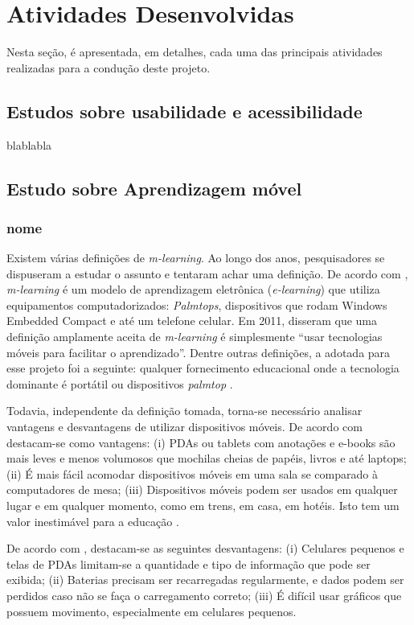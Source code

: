 \chapter{Atividades Desenvolvidas}\label{sec:ativ_desenvolvidas}
Nesta seção, é apresentada, em detalhes, cada uma das principais atividades realizadas para a condução deste projeto.

\section{Estudos sobre usabilidade e acessibilidade}\label{sec:estudos_usab_acess} 
blablabla

\section{Estudo sobre Aprendizagem móvel}\label{sec:estudos_ap_movel} 
\subsection{nome}
Existem várias definições de \textit{m-learning}. Ao longo dos anos, pesquisadores se dispuseram a estudar o assunto e tentaram achar uma definição. De acordo com \cite{Quinn2000}, \textit{m-learning} é um modelo de aprendizagem eletrônica (\textit{e-learning}) que utiliza equipamentos computadorizados: \textit{Palmtops}, dispositivos que rodam Windows Embedded Compact e até um telefone celular.
Em 2011, \cite{hwang2011research} disseram que uma definição amplamente aceita de \textit{m-learning} é simplesmente ``usar tecnologias móveis para facilitar o aprendizado''. Dentre outras definições, a adotada para esse projeto foi a seguinte: qualquer fornecimento educacional onde a tecnologia dominante é portátil ou dispositivos \textit{palmtop} \citep{traxler2005defining}.

Todavia, independente da definição tomada, torna-se necessário analisar vantagens e desvantagens de utilizar dispositivos móveis. De acordo com \cite{RICHAMEHTA2016} destacam-se como vantagens: (i) PDAs ou tablets com anotações e e-books são mais leves e menos volumosos que mochilas cheias de papéis, livros e até laptops; (ii) É mais fácil acomodar dispositivos móveis em uma sala se comparado à computadores de mesa; (iii) Dispositivos móveis podem ser usados em qualquer lugar e em qualquer momento, como em trens, em casa, em hotéis. Isto tem um valor inestimável para a educação \citep{CarmaMaia2008}.

De acordo com \cite{RICHAMEHTA2016}, destacam-se as seguintes desvantagens: (i) Celulares pequenos e telas de PDAs limitam-se a quantidade e tipo de informação que pode ser exibida; (ii) Baterias precisam ser recarregadas regularmente, e dados podem ser perdidos caso não se faça o carregamento correto; (iii) É difícil usar gráficos que possuem movimento, especialmente em celulares pequenos.

